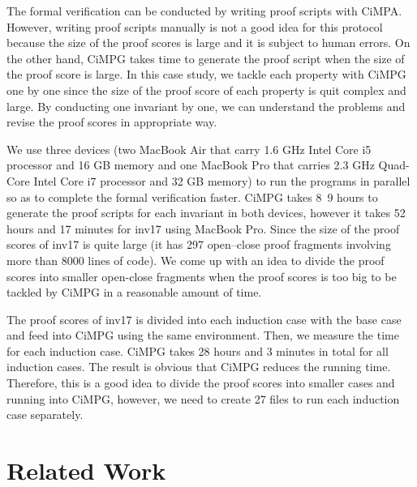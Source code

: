 \documentclass[a4paper,fleqn]{cas-dc}
\begin{document}
The formal verification can be conducted by writing  proof  scripts  with  CiMPA. However, writing proof scripts manually is not a good idea for this protocol because the size of the proof scores is large and it is subject to human errors. On the other hand, CiMPG takes time to generate the proof script when the size of the proof score is large. In this case study, we tackle each property with
CiMPG one by one since the size of the proof score of each property is quit complex and large. By conducting one invariant by one, we can understand the problems and revise the proof scores in appropriate way. 

We use three devices (two MacBook Air that carry 1.6 GHz Intel Core i5 processor and 16 GB memory and one MacBook Pro that carries 2.3 GHz Quad-Core Intel Core i7 processor and 32 GB memory) to run the programs in parallel so as to complete the formal verification faster. CiMPG takes 8~9 hours to generate the proof scripts for each invariant in both devices, however it takes 52 hours and 17 minutes for inv17 using MacBook Pro. Since the size of the proof scores of inv17 is quite large (it has 297 open–close proof fragments involving more than 8000 lines of code). We come up with an idea to divide the proof scores into smaller  open-close fragments when the proof scores is too big to be tackled by CiMPG in a reasonable amount of time.

The proof scores of inv17 is divided into each induction case with the base case and feed into CiMPG using the same environment. Then, we measure the time for each induction case. CiMPG takes 28 hours and 3 minutes in total for all induction cases. The result is obvious that CiMPG reduces the running time. Therefore, this is a good idea to divide the proof scores into smaller cases and running into CiMPG, however, we need to create 27 files to run each induction case separately. 


\section{Related Work}\label{relatedwork}
\end{document}

